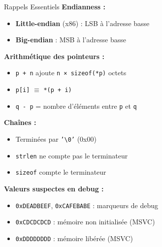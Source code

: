 \documentclass[10pt,a4paper]{article}
\begin{document}
\begin{infobox}{Rappels Essentiels}
\textbf{Endianness :}
\begin{itemize}
    \item \textbf{Little-endian} (x86) : LSB à l'adresse basse
    \item \textbf{Big-endian} : MSB à l'adresse basse
\end{itemize}

\textbf{Arithmétique des pointeurs :}
\begin{itemize}
    \item \texttt{p + n} ajoute \texttt{n × sizeof(*p)} octets
    \item \texttt{p[i]} $\equiv$ \texttt{*(p + i)}
    \item \texttt{q - p} = nombre d'éléments entre \texttt{p} et \texttt{q}
\end{itemize}

\textbf{Chaînes :}
\begin{itemize}
    \item Terminées par \texttt{'\textbackslash 0'} (0x00)
    \item \texttt{strlen} ne compte pas le terminateur
    \item \texttt{sizeof} compte le terminateur
\end{itemize}

\textbf{Valeurs suspectes en debug :}
\begin{itemize}
    \item \texttt{0xDEADBEEF}, \texttt{0xCAFEBABE} : marqueurs de debug
    \item \texttt{0xCDCDCDCD} : mémoire non initialisée (MSVC)
    \item \texttt{0xDDDDDDDD} : mémoire libérée (MSVC)
\end{itemize}
\end{infobox}
\end{document}
